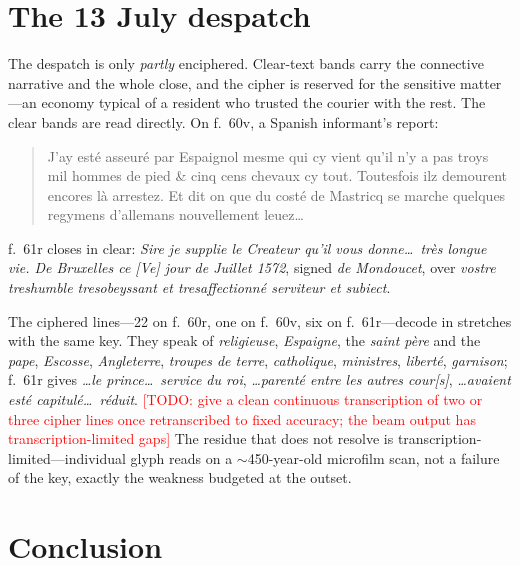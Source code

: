 \documentclass[11pt]{article}
\newcommand{\todo}[1]{\textcolor{red}{[TODO: #1]}}
\begin{document}
\section{The 13 July despatch}

The despatch is only \emph{partly} enciphered. Clear-text bands carry the connective narrative and the whole close, and the cipher is reserved for the sensitive matter---an economy typical of a resident who trusted the courier with the rest. The clear bands are read directly. On f.~60v, a Spanish informant's report:

\begin{quote}\small
J'ay est\'e asseur\'e par Espaignol mesme qui cy vient qu'il n'y a pas troys mil hommes de pied \& cinq cens chevaux cy tout. Toutesfois ilz demourent encores l\`a arrestez. Et dit on que du cost\'e de Mastricq se marche quelques regymens d'allemans nouvellement leuez\ldots
\end{quote}

\noindent f.~61r closes in clear: \emph{Sire je supplie le Createur qu'il vous donne\ldots\ tr\`es longue vie. De Bruxelles ce [Ve] jour de Juillet 1572}, signed \emph{de Mondoucet}, over \emph{vostre treshumble tresobeyssant et tresaffectionn\'e serviteur et subiect}.

The ciphered lines---22 on f.~60r, one on f.~60v, six on f.~61r---decode in stretches with the same key. They speak of \emph{religieuse}, \emph{Espaigne}, the \emph{saint p\`ere} and the \emph{pape}, \emph{Escosse}, \emph{Angleterre}, \emph{troupes de terre}, \emph{catholique}, \emph{ministres}, \emph{libert\'e}, \emph{garnison}; f.~61r gives \emph{\ldots le prince\ldots\ service du roi}, \emph{\ldots parent\'e entre les autres cour[s]}, \emph{\ldots avaient est\'e capitul\'e\ldots\ r\'eduit}. \todo{give a clean continuous transcription of two or three cipher lines once retranscribed to fixed accuracy; the beam output has transcription-limited gaps} The residue that does not resolve is transcription-limited---individual glyph reads on a $\sim$450-year-old microfilm scan, not a failure of the key, exactly the weakness budgeted at the outset.

\section{Conclusion}
\end{document}
